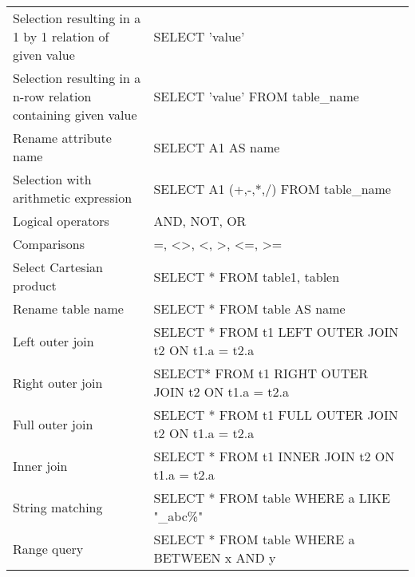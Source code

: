 \documentclass[a4paper,8pt,twocolumn]{extarticle}
\begin{document}
\begin{table}[h]
{\begin{tabular}{p{0.35\linewidth} | p{0.65\linewidth}}
Selection resulting in a 1 by 1 relation of given value        & SELECT 'value'                                                                           \\
Selection resulting in a n-row relation containing given value & SELECT 'value' FROM table\_name                                                          \\
Rename attribute name                                          & SELECT A1 AS name                                                                        \\
Selection with arithmetic expression                           & SELECT A1 (+,-,*,/) FROM table\_name                                                     \\
Logical operators                                              & AND, NOT, OR                                                                             \\
Comparisons                                                    & =, \textless{}\textgreater{}, \textless{}, \textgreater{}, \textless{}=, \textgreater{}= \\
Select Cartesian product                                       & SELECT * FROM table1, tablen                                                             \\
Rename table name                                              & SELECT * FROM table AS name                                                              \\
Left outer join                                                & SELECT * FROM t1 LEFT OUTER JOIN t2 ON t1.a = t2.a                                       \\
Right outer join                                               & SELECT* FROM t1 RIGHT OUTER JOIN t2 ON t1.a = t2.a                                       \\
Full outer join                                                & SELECT * FROM t1 FULL OUTER JOIN t2 ON t1.a = t2.a                                       \\
Inner join                                                     & SELECT * FROM t1 INNER JOIN t2 ON t1.a = t2.a                                            \\
String matching                                                & SELECT * FROM table WHERE a LIKE "\_abc\%"                                               \\
Range query                                                    & SELECT * FROM table WHERE a BETWEEN x AND y                                              \\

\end{tabular}}
\end{table}
\end{document}
